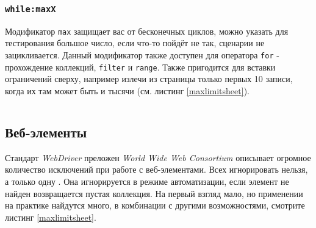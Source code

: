 \subsubsection{\texttt{while:maxX}}

Модификатор \texttt{max} защищает вас от бесконечных циклов, можно указать для тестирования большое число, если что-то пойдёт не так, сценарии не зацикливается. Данный модификатор также доступен для оператора \texttt{for} - прохождение коллекций, \texttt{filter} и \texttt{range}. Также пригодится для вставки ограничений сверху, например излечи из страницы только первых 10 записи, когда их там может быть и тысячи (см. листинг \ref{maxlimitsheet}).

\begin{sourcecode}
	\label{maxlimitsheet}
    \inputminted[linenos]{icl}{../sources/maxlimitsheet.icL}
\end{sourcecode}

\subsection{Веб-элементы}

Стандарт \textit{WebDriver} преложен \textit{World Wide Web Consortium} описывает огромное количество исключений при работе с веб-элементами. Всех игнорировать нельзя, а только одну . Она игнорируется в режиме автоматизации, если элемент не найден возвращается пустая коллекция. На первый взгляд мало, но применении на практике найдутся много, в комбинации с другими возможностями, смотрите листинг \ref{maxlimitsheet}.

\begin{sourcecode}
	\label{maxlimitsheet}
    \inputminted[linenos]{icl}{../sources/maxlimitsheet.icL}
\end{sourcecode}


